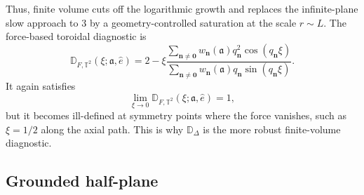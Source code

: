 \documentclass[nopacs,amsmath,amsfonts,amssymb,aps,superscriptaddress]{revtex4}
\begin{document}
Thus, finite volume cuts off the logarithmic growth and replaces the infinite-plane slow approach to $3$ by a geometry-controlled saturation at the scale $r\sim L$. The force-based toroidal diagnostic is
\begin{equation}
  \mathbb D_{F,\mathbb T^2}(\xi;\mathfrak{a},\hat e)=2-\xi\frac{\displaystyle\sum_{\mathbf n\neq\mathbf 0}w_{\mathbf n}(\mathfrak{a})q_{\mathbf n}^2\cos(q_{\mathbf n}\xi)}{\displaystyle\sum_{\mathbf n\neq\mathbf 0}w_{\mathbf n}(\mathfrak{a})q_{\mathbf n}\sin(q_{\mathbf n}\xi)}.
\end{equation}
It again satisfies
\begin{equation}
  \lim_{\xi\to0}\mathbb D_{F,\mathbb T^2}(\xi;\mathfrak{a},\hat e)=1,
\end{equation}
but it becomes ill-defined at symmetry points where the force vanishes, such as $\xi=1/2$ along the axial path. This is why $\mathbb D_\Delta$ is the more robust finite-volume diagnostic.

\subsection{Grounded half-plane}
\label{subsec:running_dimension_halfplane}
\end{document}
